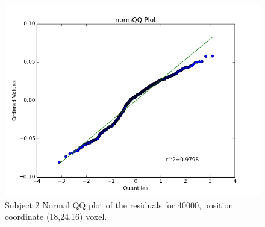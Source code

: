 \begin{figure}[ht]
\centering
\includegraphics[scale=0.5]{figures/qqplot}  
\caption{Subject 2 Normal QQ plot of the residuals for 40000, position 
coordinate (18,24,16) voxel.}
\label{fig:qqplot}
\end{figure}



